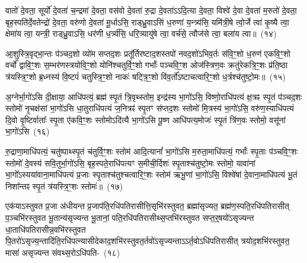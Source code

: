 वातो॑ दे॒वता॒ सूर्यो॑ दे॒वता॑ च॒न्द्रमा॑ दे॒वता॒ वस॑वो दे॒वता॑ रु॒द्रा दे॒वता॑ऽऽदि॒त्या दे॒वता॒ विश्वे॑ दे॒वा दे॒वता॑ म॒रुतो॑ दे॒वता॒ बृह॒स्पति॑र्दे॒वतेन्द्रो॑ दे॒वता॒ वरु॑णो दे॒वता॑ मू॒र्धाऽसि॒ राड्ध्रु॒वाऽसि॑ ध॒रुणा॑ य॒न्त्र्य॑सि॒ यमि॑त्री॒षे त्वो॒र्जे त्वा॑ कृ॒ष्यै त्वा॒ क्षेमा॑य त्वा॒ यन्त्री॒ राड्ध्रु॒वाऽसि॒ धर॑णी ध॒र्त्र्य॑सि॒ धरि॒त्र्यायु॑षे त्वा॒ वर्च॑से॒ त्वौज॑से त्वा॒ बला॑य त्वा॥~(१४)

{\anuvakamend[{दे॒वता\-ऽऽ\-यु॑षे त्वा॒ षट्च॑}]}%

आ॒शुस्त्रि॒वृद्भा॒न्तः प॑ञ्चद॒शो व्यो॑म सप्तद॒शः प्रतू᳚र्तिरष्टाद॒शस्तपो॑ नवद॒शो॑\-ऽभिव॒र्तः स॑वि॒ꣳ॒शो ध॒रुण॑ एकवि॒ꣳ॒शो वर्चो᳚ द्वा\-वि॒ꣳ॒शः स॒म्भर॑णस्त्रयो\-वि॒ꣳ॒शो योनि॑श्चतुर्वि॒ꣳ॒शो गर्भाः᳚ पञ्च\-वि॒ꣳ॒श ओज॑स्\-त्रिण॒वः क्रतु॑रेकत्रि॒ꣳ॒शः प्र॑ति॒ष्ठा त्र॑यस्त्रि॒ꣳ॒शो ब्र॒ध्नस्य॑ वि॒ष्टपं॑ चतुस्\-त्रि॒ꣳ॒शो नाकः॑ षट्त्रि॒ꣳ॒शो वि॑व॒र्तो᳚\-ऽष्टाचत्वारि॒ꣳ॒शो ध॒र्त्रश्च॑तुष्टो॒मः॥~(१५)

{\anuvakamend[{आ॒शुः स॒प्तत्रिꣳ॑शत्}]}%

अ॒ग्नेर्भा॒गो॑\-ऽसि दी॒क्षाया॒ आधि॑पत्यं॒ ब्रह्म॑ स्पृ॒तं त्रि॒वृथ्स्तोम॒ इन्द्र॑स्य भा॒गो॑\-ऽसि॒ विष्णो॒राधि॑पत्यं क्ष॒त्रꣴ स्पृ॒तं प॑ञ्चद॒शः स्तोमो॑ नृ॒चक्ष॑सां भा॒गो॑\-ऽसि धा॒तुराधि॑पत्यं ज॒नित्रꣴ॑ स्पृ॒तꣳ स॑प्तद॒शः स्तोमो॑ मि॒त्रस्य॑ भा॒गो॑\-ऽसि॒ वरु॑ण॒स्याधि॑पत्यं दि॒वो वृ॒ष्टिर्वाताः᳚ स्पृ॒ता ए॑क\-वि॒ꣳ॒शः स्तोमो\-ऽदि॑त्यै भा॒गो॑\-ऽसि पू॒ष्ण आधि॑पत्य॒मोजः॑ स्पृ॒तं त्रि॑ण॒वः स्तोमो॒ वसू॑नां भा॒गो॑\-ऽसि~(१६)

रु॒द्राणा॒माधि॑पत्यं॒ चतु॑ष्पाथ्स्पृ॒तं च॑तुर्वि॒ꣳ॒शः स्तोम॑ आदि॒त्यानां᳚ भा॒गो॑\-ऽसि म॒रुता॒माधि॑पत्यं॒ गर्भाः᳚ स्पृ॒ताः प॑ञ्च\-वि॒ꣳ॒शः स्तोमो॑ दे॒वस्य॑ सवि॒तुर्भा॒गो॑\-ऽसि॒ बृह॒स्पते॒राधि॑पत्यꣳ स॒मीची॒र्दिशः॑ स्पृ॒ताश्च॑तुष्टो॒मः स्तोमो॒ यावा॑नां भा॒गो᳚\-ऽस्यया॑वाना॒माधि॑पत्यं प्र॒जाः स्पृ॒ताश्च॑तुश्चत्वारि॒ꣳ॒शः स्तोम॑ ऋभू॒णां भा॒गो॑\-ऽसि॒ विश्वे॑षां दे॒वाना॒माधि॑पत्यं भू॒तं निशा᳚न्तꣴ स्पृ॒तं त्र॑यस्त्रि॒ꣳ॒शः स्तोमः॑॥~(१७)

{\anuvakamend[{वसू॑नां भा॒गो॑\-ऽसि॒ षट्च॑त्वारिꣳशच्च}]}%

एक॑याऽस्तुवत प्र॒जा अ॑धीयन्त प्र॒जा\-प॑ति॒रधि॑\-पतिरासीत्ति॒सृभि॑\-रस्तुवत॒ ब्रह्मा॑सृज्यत॒ ब्रह्म॑ण॒स्पति॒रधि॑\-पतिरासीत् प॒ञ्चभि॑\-रस्तुवत भू॒तान्य॑सृज्यन्त भू॒तानां॒ पति॒रधि॑\-पतिरासीथ्स॒प्तभि॑\-रस्तुवत सप्त॒र्॒\mbox{}षयो॑\-ऽ\-सृज्यन्त धा॒ताधि॑\-पतिरा\-सीन्न॒वभि॑\-रस्तुवत पि॒तरो॑\-ऽसृज्य॒न्ता\-दि॑ति॒\-रधि॑\-पत्न्यासीदेकाद॒शभि॑\-रस्तुवत॒र्तवो॑\-ऽसृज्यन्ता\-ऽ\-ऽ\-र्त॒वो\-ऽधि॑\-पतिरासीत् त्रयोद॒शभि॑\-रस्तुवत॒ मासा॑ असृज्यन्त संवथ्स॒रो\-ऽधि॑\-पति-~(१८)

